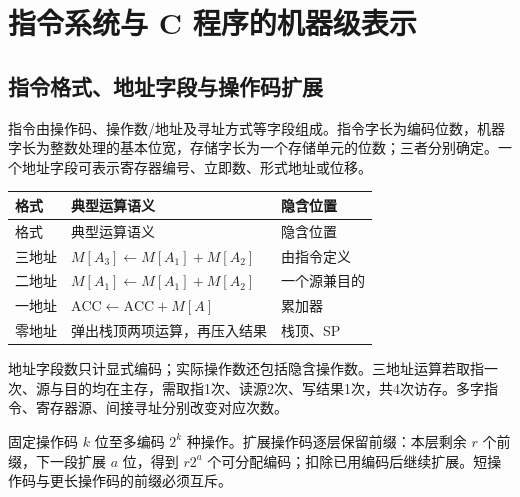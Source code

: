 \chapter{指令系统与 C 程序的机器级表示}\label{CO04}

\section{指令格式、地址字段与操作码扩展}\label{CO04-format}

指令由操作码、操作数/地址及寻址方式等字段组成。指令字长为编码位数，机器字长为整数处理的基本位宽，存储字长为一个存储单元的位数；三者分别确定。一个地址字段可表示寄存器编号、立即数、形式地址或位移。

\par\smallskip
{\fontsize{9.3}{12}\selectfont\setlength{\tabcolsep}{2.5pt}\setlength{\LTleft}{0pt}\setlength{\LTright}{0pt}
\begin{longtable}{@{}>{\raggedright\arraybackslash}p{}>{\raggedright\arraybackslash}p{}>{\raggedright\arraybackslash}p{}@{}}
\toprule
格式 & 典型运算语义 & 隐含位置 \\

\midrule\endfirsthead\toprule
格式 & 典型运算语义 & 隐含位置 \\

\midrule\endhead\bottomrule\endfoot
三地址 & \(M[A_3]\leftarrow M[A_1]+M[A_2]\) & 由指令定义 \\

二地址 & \(M[A_1]\leftarrow M[A_1]+M[A_2]\) & 一个源兼目的 \\

一地址 & \(\mathrm{ACC}\leftarrow\mathrm{ACC}+M[A]\) & 累加器 \\

零地址 & 弹出栈顶两项运算，再压入结果 & 栈顶、SP \\

\end{longtable}}
\par\smallskip

地址字段数只计显式编码；实际操作数还包括隐含操作数。三地址运算若取指一次、源与目的均在主存，需取指1次、读源2次、写结果1次，共4次访存。多字指令、寄存器源、间接寻址分别改变对应次数。

固定操作码 \(k\) 位至多编码 \(2^k\) 种操作。扩展操作码逐层保留前缀：本层剩余 \(r\) 个前缀，下一段扩展 \(a\) 位，得到 \(r2^a\) 个可分配编码；扣除已用编码后继续扩展。短操作码与更长操作码的前缀必须互斥。

